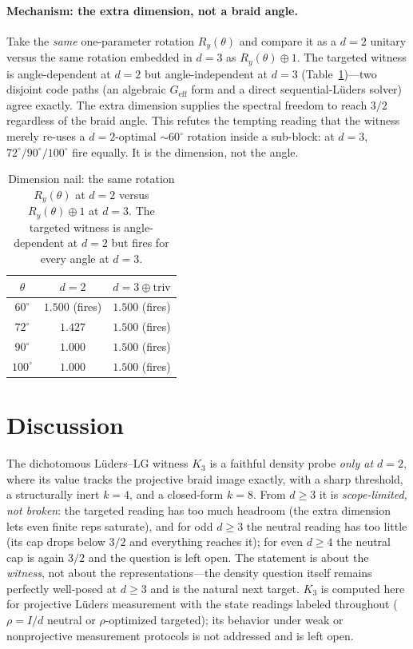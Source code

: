 \documentclass[aps,prx,reprint,amsmath,amssymb,floatfix,nofootinbib,superscriptaddress]{revtex4-2}
\begin{document}
\paragraph{Mechanism: the extra dimension, not a braid angle.}
Take the \emph{same} one-parameter rotation $R_y(\theta)$ and compare it as a $d=2$
unitary versus the same rotation embedded in $d=3$ as $R_y(\theta) \oplus 1$. The
targeted witness is angle-dependent at $d=2$ but angle-independent at $d=3$
(Table~\ref{tab:nail})---two disjoint code paths (an algebraic $G_{\mathrm{eff}}$ form
and a direct sequential-L\"uders solver) agree exactly. The extra dimension supplies
the spectral freedom to reach $3/2$ regardless of the braid angle. This refutes the
tempting reading that the witness merely re-uses a $d=2$-optimal $\sim 60^\circ$
rotation inside a sub-block: at $d=3$, $72^\circ/90^\circ/100^\circ$ fire equally. It
is the dimension, not the angle.

\begin{table}[t]
\caption{Dimension nail: the same rotation $R_y(\theta)$ at $d=2$ versus
$R_y(\theta) \oplus 1$ at $d=3$. The targeted witness is angle-dependent at $d=2$ but
fires for every angle at $d=3$.}
\label{tab:nail}
\centering
\begin{tabular}{c c c}
\toprule
$\theta$ & $d=2$ & $d=3 \oplus \mathrm{triv}$ \\
\midrule
$60^\circ$  & $1.500$ (fires) & $1.500$ (fires) \\
$72^\circ$  & $1.427$         & $\mathbf{1.500}$ (fires) \\
$90^\circ$  & $1.000$         & $\mathbf{1.500}$ (fires) \\
$100^\circ$ & $1.000$         & $\mathbf{1.500}$ (fires) \\
\bottomrule
\end{tabular}
\end{table}

\section{Discussion}
\label{sec:disc}

The dichotomous L\"uders--LG witness $K_3$ is a faithful density probe \emph{only at $d=2$},
where its value tracks the projective braid image exactly, with a sharp threshold, a
structurally inert $k=4$, and a closed-form $k=8$. From $d \ge 3$ it is
\emph{scope-limited, not broken}: the targeted reading has too much headroom (the
extra dimension lets even finite reps saturate), and for odd $d \ge 3$ the neutral
reading has too little (its cap drops below $3/2$ and everything reaches it); for
even $d \ge 4$ the neutral cap is again $3/2$ and the question is left open. The
statement is about the \emph{witness}, not about the representations---the density
question itself remains perfectly well-posed at $d \ge 3$ and is the natural next
target. $K_3$ is
computed here for projective L\"uders measurement with the state readings labeled
throughout ($\rho=I/d$ neutral or $\rho$-optimized targeted); its behavior under
weak or nonprojective measurement protocols is not addressed and is left open.
\end{document}
